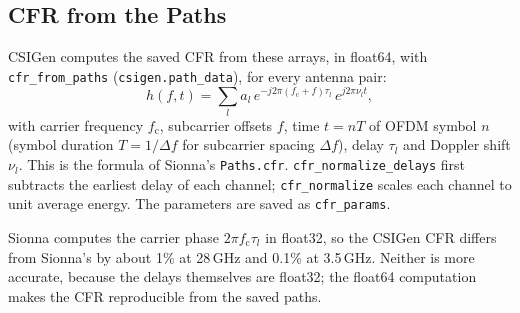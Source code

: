 \documentclass{article}
\newcommand{\key}[1]{\texttt{#1}}
\begin{document}
\subsection{CFR from the Paths}
CSIGen computes the saved CFR from these arrays, in float64, with \texttt{cfr\_from\_paths} (\texttt{csigen.path\_data}), for every antenna pair:
\[
h(f, t) = \sum_{l} a_l \, e^{-j 2\pi (f_\mathrm{c} + f) \tau_l} \, e^{j 2\pi \nu_l t},
\]
with carrier frequency $f_\mathrm{c}$, subcarrier offsets $f$, time $t = n T$ of OFDM symbol $n$ (symbol duration $T = 1/\Delta f$ for subcarrier spacing $\Delta f$), delay $\tau_l$ and Doppler shift $\nu_l$. This is the formula of Sionna's \texttt{Paths.cfr}. \key{cfr\_normalize\_delays} first subtracts the earliest delay of each channel; \key{cfr\_normalize} scales each channel to unit average energy. The parameters are saved as \texttt{cfr\_params}.

Sionna computes the carrier phase $2\pi f_\mathrm{c} \tau_l$ in float32, so the CSIGen CFR differs from Sionna's by about 1\% at 28\,GHz and 0.1\% at 3.5\,GHz. Neither is more accurate, because the delays themselves are float32; the float64 computation makes the CFR reproducible from the saved paths.
\end{document}
